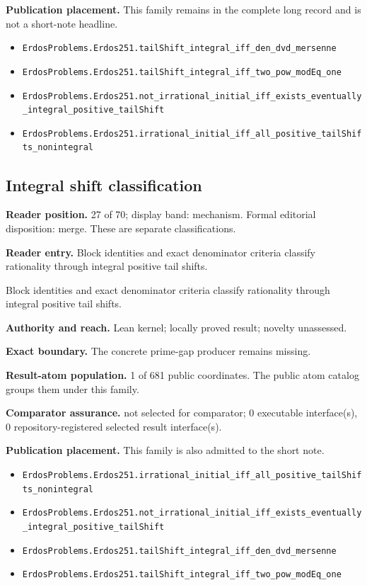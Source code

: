 \documentclass[11pt]{article}
\begin{document}
\textbf{Publication placement.} This family remains in the complete long record and is not a short-note headline.

\begin{itemize}
  \item \nolinkurl{ErdosProblems.Erdos251.tailShift_integral_iff_den_dvd_mersenne}
  \item \nolinkurl{ErdosProblems.Erdos251.tailShift_integral_iff_two_pow_modEq_one}
  \item \nolinkurl{ErdosProblems.Erdos251.not_irrational_initial_iff_exists_eventually_integral_positive_tailShift}
  \item \nolinkurl{ErdosProblems.Erdos251.irrational_initial_iff_all_positive_tailShifts_nonintegral}
\end{itemize}

\subsection{Integral shift classification}
\textbf{Reader position.} 27 of 70; display band: mechanism.  Formal editorial disposition: merge.  These are separate classifications.

\textbf{Reader entry.} Block identities and exact denominator criteria classify rationality through integral positive tail shifts.

Block identities and exact denominator criteria classify rationality through integral positive tail shifts.

\textbf{Authority and reach.} Lean kernel; locally proved result; novelty unassessed.

\textbf{Exact boundary.} The concrete prime-gap producer remains missing.

\textbf{Result-atom population.} 1 of 681 public coordinates. The public atom catalog groups them under this family.

\textbf{Comparator assurance.} not selected for comparator; 0 executable interface(s), 0 repository-registered selected result interface(s).

\textbf{Publication placement.} This family is also admitted to the short note.

\begin{itemize}
  \item \nolinkurl{ErdosProblems.Erdos251.irrational_initial_iff_all_positive_tailShifts_nonintegral}
  \item \nolinkurl{ErdosProblems.Erdos251.not_irrational_initial_iff_exists_eventually_integral_positive_tailShift}
  \item \nolinkurl{ErdosProblems.Erdos251.tailShift_integral_iff_den_dvd_mersenne}
  \item \nolinkurl{ErdosProblems.Erdos251.tailShift_integral_iff_two_pow_modEq_one}
\end{itemize}
\end{document}
